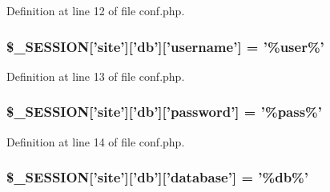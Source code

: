 \-Definition at line 12 of file conf.\-php.

\hypertarget{lib_2site__setup_2conf_8php_a52abc60f7405711ec86306adcc75bb52}{
\subsubsection[{\$\-\_\-\-S\-E\-S\-S\-I\-O\-N}]{\setlength{\rightskip}{0pt plus 5cm}\$\-\_\-\-S\-E\-S\-S\-I\-O\-N\mbox{[}'site'\mbox{]}\mbox{[}'db'\mbox{]}\mbox{[}'username'\mbox{]} = '\%user\%'}}\label{lib_2site__setup_2conf_8php_a52abc60f7405711ec86306adcc75bb52}


\-Definition at line 13 of file conf.\-php.

\hypertarget{lib_2site__setup_2conf_8php_add5af83c057b1684ddee38e593f49fe3}{
\subsubsection[{\$\-\_\-\-S\-E\-S\-S\-I\-O\-N}]{\setlength{\rightskip}{0pt plus 5cm}\$\-\_\-\-S\-E\-S\-S\-I\-O\-N\mbox{[}'site'\mbox{]}\mbox{[}'db'\mbox{]}\mbox{[}'{\bf password}'\mbox{]} = '\%pass\%'}}\label{lib_2site__setup_2conf_8php_add5af83c057b1684ddee38e593f49fe3}


\-Definition at line 14 of file conf.\-php.

\hypertarget{lib_2site__setup_2conf_8php_ae6d86271937ef718137778389e84c84d}{
\subsubsection[{\$\-\_\-\-S\-E\-S\-S\-I\-O\-N}]{\setlength{\rightskip}{0pt plus 5cm}\$\-\_\-\-S\-E\-S\-S\-I\-O\-N\mbox{[}'site'\mbox{]}\mbox{[}'db'\mbox{]}\mbox{[}'database'\mbox{]} = '\%db\%'}}\label{lib_2site__setup_2conf_8php_ae6d86271937ef718137778389e84c84d}


